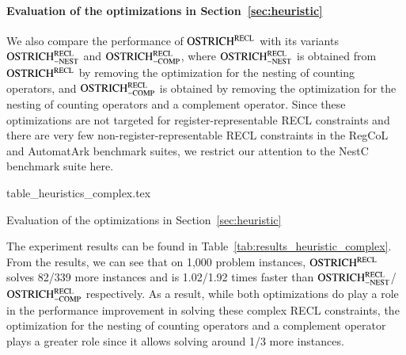 \paragraph*{Evaluation of the optimizations in Section~\ref{sec:heuristic}}
%
We also compare the performance of $\rm OSTRICH^{RECL}$ with its variants $\rm OSTRICH^{RECL}_{\rm -NEST}$ and $\rm OSTRICH^{RECL}_{\rm -COMP}$, where $\rm OSTRICH^{RECL}_{\rm -NEST}$ is obtained from $\rm OSTRICH^{RECL}$ by removing the optimization for the nesting of counting operators, and $\rm OSTRICH^{RECL}_{\rm -COMP}$ is obtained by removing the optimization for the nesting of counting operators and a complement operator. Since these optimizations are not targeted for register-representable RECL constraints and there are very few non-register-representable RECL constraints in the RegCoL and AutomatArk benchmark suites, we restrict our attention to the NestC benchmark suite here. 

\begin{table}[htbp]
  {table_heuristics_complex.tex}
  \caption{Evaluation of the optimizations in Section~\ref{sec:heuristic}}\label{tab:results_heuristic_complex}
\end{table}

The experiment results can be found in Table~\ref{tab:results_heuristic_complex}. From the results, we can see that on 1,000 problem instances, $\rm OSTRICH^{RECL}$ solves 82/339 more instances and is 1.02/1.92 times faster than $\rm OSTRICH^{RECL}_{\rm -NEST}$/$\rm OSTRICH^{RECL}_{\rm -COMP}$ respectively. As a result, while both optimizations do play a role in the performance improvement in solving these complex RECL constraints, the optimization for the nesting of counting operators and a complement operator plays a greater role since it allows solving around 1/3 more instances. 



